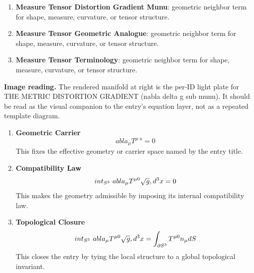 \begin{enumerate}[leftmargin=1.6em,itemsep=6pt,topsep=4pt]
\item \textbf{Measure Tensor Distortion Gradient Munu}: geometric neighbor term for shape, measure, curvature, or tensor structure.
\item \textbf{Measure Tensor Geometric Analogue}: geometric neighbor term for shape, measure, curvature, or tensor structure.
\item \textbf{Measure Tensor Terminology}: geometric neighbor term for shape, measure, curvature, or tensor structure.
\end{enumerate}

\begin{samepage}
\noindent\begin{minipage}[t]{0.45\linewidth}
\vspace{0pt}
\raggedright
\scriptsize\textbf{Image reading.} The rendered manifold at right is the per-ID light plate for THE METRIC DISTORTION GRADIENT (nabla delta g sub munu). It should be read as the visual companion to the entry's equation layer, not as a repeated template diagram.\par
\end{minipage}\hfill
\begin{minipage}[t]{0.53\linewidth}
\vspace*{-0.10in}
\raggedright
{}
\end{minipage}
\end{samepage}

\clearpage


\begin{enumerate}[leftmargin=1.6em,itemsep=9pt,topsep=6pt]
\item \textbf{Geometric Carrier}
\[
abla_\mu T^{\mu\ u} = 0
\]
This fixes the effective geometry or carrier space named by the entry title.

\item \textbf{Compatibility Law}
\[
int_{S^3} \ abla_\mu T^{\mu 0} \sqrt{g} \\, d^3x = 0
\]
This makes the geometry admissible by imposing its internal compatibility law.

\item \textbf{Topological Closure}
\[
int_{S^3} \ abla_\mu T^{\mu 0} \sqrt{g} \\, d^3x = \int_{\partial S^3} T^{\mu 0} n_\mu dS
\]
This closes the entry by tying the local structure to a global topological invariant.
\end{enumerate}

